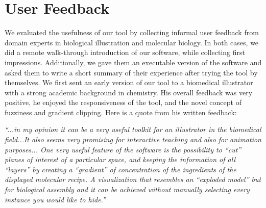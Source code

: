 \vspace{-4mm}
\section{User Feedback}

We evaluated the usefulness of our tool by collecting informal user feedback from domain experts in biological illustration and molecular biology.
In both cases, we did a remote walk-through introduction of our software, while collecting first impressions.
Additionally, we gave them an executable version of the software and asked them to write a short summary of their experience after trying the tool by themselves.
We first sent an early version of our tool to a biomedical illustrator with a strong academic background in chemistry. 
His overall feedback was very positive, he enjoyed the responsiveness of the tool, and the novel concept of fuzziness and gradient clipping.
Here is a quote from his written feedback:


\textit{``...in my opinion it can be a very useful toolkit for an illustrator in the biomedical field...It also seems very promising for interactive teaching and also for animation purposes...
One very useful feature of the software is the possibility to ``cut'' planes of interest of a particular space, and keeping the information of all ``layers'' by creating a ``gradient'' of concentration of the ingredients of the displayed molecular recipe. 
A visualization that resembles an ``exploded model'' but for biological assembly and it can be achieved without manually selecting every instance you would like to hide.''}

